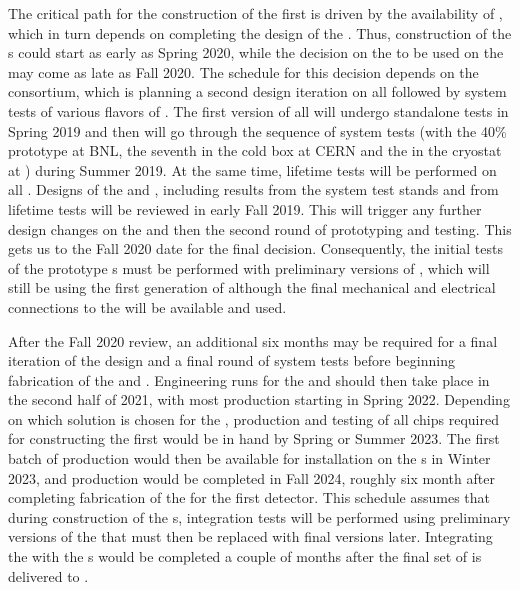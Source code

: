 The critical path for the construction of the first 
  is driven by the availability of ,
which in turn depends on completing the design of the
. Thus, construction
of the s could start as early as Spring 2020, while the
decision on the  to be used on the 
may come as late as Fall 2020. The schedule for this decision
depends on the  consortium, which is
planning a second design iteration on all 
followed by system tests of various flavors of .
The first version of all  will undergo
standalone tests in Spring 2019 and then will go through the 
sequence of system tests (with the 40\%  prototype at BNL,
the seventh   in the cold box at CERN
and the  in the  cryostat at )
during Summer 2019. At the same time, lifetime tests will be performed 
on all . Designs of the  and , including results
from the system test stands and from lifetime tests will be reviewed
in early Fall 2019. This will trigger any further design
changes on the  and then the second round of prototyping
and testing. This gets us to the Fall 2020 date for the final
 decision. Consequently, the initial
tests of the  prototype s must be performed
with preliminary versions of , which will still be using
the first generation of  although the final 
mechanical and electrical connections to the  will be available and used.

After the Fall 2020 review, an additional six months may be 
required for a final iteration of the  design
and a final round of system tests before beginning fabrication
of the  and . Engineering runs
for the  and  should then take place in the
second half of 2021, with most production starting in
Spring 2022. Depending on which solution is chosen for the
, production and testing of all chips required
for constructing the first   
would be in hand by Spring or Summer 2023. The first batch of
production  would then be available for installation on
the s in Winter 2023, and production would be
completed in Fall 2024, roughly six month after completing
fabrication of the  for the first detector.
This schedule assumes that during construction of the 
s, integration tests will be performed using preliminary
versions of the  that must then be replaced
with final versions later. Integrating the 
with the s would be completed a couple of months after
the final set of  is delivered to .

